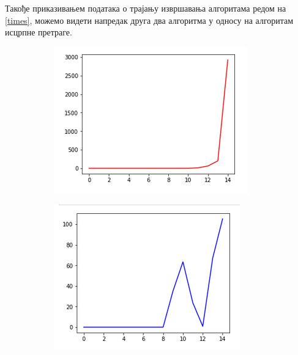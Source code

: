 \documentclass[a4paper]{article}
\begin{document}
{Такође приказивањем података о трајању извршавања алгоритама редом на \ref{times}, можемо видети напредак друга два алгоритма у односу на алгоритам исцрпне претраге.
\begin{figure}[h!]
	\centering
	\begin{subfigure}{.3\textwidth}
		\centering
		\includegraphics[width=\linewidth]{images/bf_time.png}
	\end{subfigure}
	\begin{subfigure}{.3\textwidth}
		\centering
		\includegraphics[width=\linewidth]{images/ga_time.png}
	\end{subfigure}
	\begin{subfigure}{.3\textwidth}

\end{subfigure}
\end{figure}}
\end{document}
